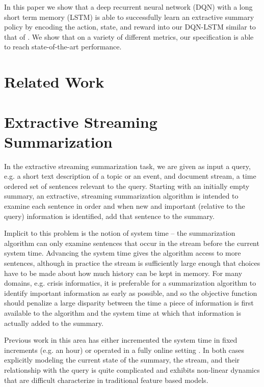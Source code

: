 \documentclass[12pt]{article}
\begin{document}
In this paper we show that a deep recurrent neural network (DQN) with a long short term memory (LSTM) is able to successfully learn an extractive summary policy by encoding the action, state, and reward into our DQN-LSTM similar to that of  \cite{hausknecht2015deep}. We show that on a variety of different metrics, our specification is able to reach state-of-the-art performance.

\section{Related Work}

\section{Extractive Streaming Summarization}

  In the extractive streaming summarization task, we are given as input
  a query, e.g. a short text description of a topic or an event, and 
  document stream, a time ordered set of sentences 
  relevant to the query. Starting with an initially empty summary,  
  an extractive, streaming summarization algorithm is intended to 
  examine each sentence in order and when new and important (relative to the 
  query) information is identified, add that sentence to the summary. 

  Implicit to this problem is the notion of system time -- the 
  summarization algorithm can only examine sentences that occur in the stream
  before the current system time. Advancing the system time gives the algorithm
  access to more sentences, although in practice the stream is sufficiently 
  large enough that choices have to be made about how much history can be 
  kept in memory. For many domains, e.g. crisis informatics, it is preferable
  for a summarization algorithm to identify important information as early as 
  possible, and so the objective function should penalize a large disparity
  between the time a piece of information is first available to the algorithm
  and the system time at which that information is actually added to the 
  summary.

  Previous work in this area has either incremented the system time in fixed
  increments (e.g. an hour) 
  \cite{mccreadie2014incremental,kedzie2015predicting} or operated in
  a fully online setting \cite{guo2013updating,kedzie2016real}. In both cases 
  explicitly 
  modeling the current state of the summary, the stream, and their relationship
  with the query is quite complicated and exhibits non-linear dynamics that 
  are difficult characterize in traditional feature based models.
\end{document}
